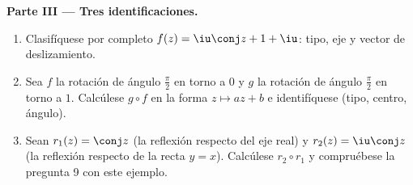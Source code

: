 \begin{problem}
\medskip
\noindent\textbf{Parte III --- Tres identificaciones.}
\begin{enumerate}[resume]
  \item Clasifíquese por completo $f(z) = \iu\conj z + 1 + \iu$:
        tipo, eje y vector de deslizamiento.
  \item Sea $f$ la rotación de ángulo $\frac\pi2$ en torno a $0$ y
        $g$ la rotación de ángulo $\frac\pi2$ en torno a $1$.
        Calcúlese $g \circ f$ en la forma $z \mapsto az + b$ e
        identifíquese (tipo, centro, ángulo).
  \item Sean $r_1(z) = \conj z$ (la reflexión respecto del eje real)
        y $r_2(z) = \iu\conj z$ (la reflexión respecto de la recta
        $y = x$). Calcúlese $r_2 \circ r_1$ y compruébese la
        pregunta 9 con este ejemplo.
\end{enumerate}


\end{problem}
